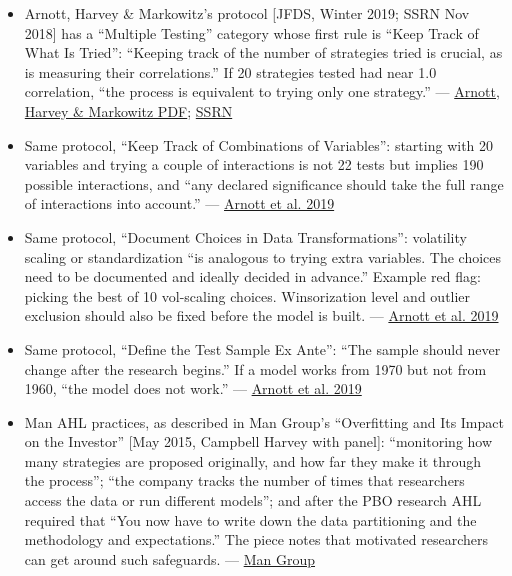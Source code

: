 \documentclass{article}
\begin{document}
\begin{itemize}

\item Arnott, Harvey \& Markowitz's protocol [JFDS, Winter 2019; SSRN Nov 2018] has a ``Multiple Testing'' category whose first rule is ``Keep Track of What Is Tried'': ``Keeping track of the number of strategies tried is crucial, as is measuring their correlations.'' If 20 strategies tested had near 1.0 correlation, ``the process is equivalent to trying only one strategy.'' --- \href{https://people.duke.edu/~charvey/Research/Published_Papers/P138_A_backtesting_protocol.pdf}{Arnott, Harvey \& Markowitz PDF}; \href{https://papers.ssrn.com/sol3/papers.cfm?abstract_id=3275654}{SSRN}

\item Same protocol, ``Keep Track of Combinations of Variables'': starting with 20 variables and trying a couple of interactions is not 22 tests but implies 190 possible interactions, and ``any declared significance should take the full range of interactions into account.'' --- \href{https://people.duke.edu/~charvey/Research/Published_Papers/P138_A_backtesting_protocol.pdf}{Arnott et al. 2019}

\item Same protocol, ``Document Choices in Data Transformations'': volatility scaling or standardization ``is analogous to trying extra variables. The choices need to be documented and ideally decided in advance.'' Example red flag: picking the best of 10 vol-scaling choices. Winsorization level and outlier exclusion should also be fixed before the model is built. --- \href{https://people.duke.edu/~charvey/Research/Published_Papers/P138_A_backtesting_protocol.pdf}{Arnott et al. 2019}

\item Same protocol, ``Define the Test Sample Ex Ante'': ``The sample should never change after the research begins.'' If a model works from 1970 but not from 1960, ``the model does not work.'' --- \href{https://people.duke.edu/~charvey/Research/Published_Papers/P138_A_backtesting_protocol.pdf}{Arnott et al. 2019}

\item Man AHL practices, as described in Man Group's ``Overfitting and Its Impact on the Investor'' [May 2015, Campbell Harvey with panel]: ``monitoring how many strategies are proposed originally, and how far they make it through the process''; ``the company tracks the number of times that researchers access the data or run different models''; and after the PBO research AHL required that ``You now have to write down the data partitioning and the methodology and expectations.'' The piece notes that motivated researchers can get around such safeguards. --- \href{https://www.man.com/insights/overfitting-and-its-impact-on-the-investor}{Man Group}


\end{itemize}
\end{document}
